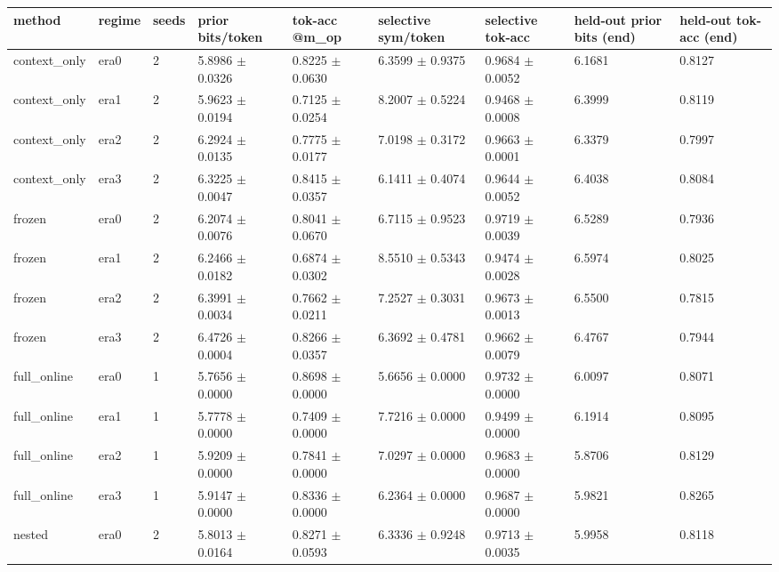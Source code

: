 \begin{tabular}{lllllllll}
\hline
method & regime & seeds & prior bits/token & tok-acc @m\_op & selective sym/token & selective tok-acc & held-out prior bits (end) & held-out tok-acc (end) \\
\hline
context\_only & era0 & 2 & 5.8986 $\pm$ 0.0326 & 0.8225 $\pm$ 0.0630 & 6.3599 $\pm$ 0.9375 & 0.9684 $\pm$ 0.0052 & 6.1681 & 0.8127 \\
context\_only & era1 & 2 & 5.9623 $\pm$ 0.0194 & 0.7125 $\pm$ 0.0254 & 8.2007 $\pm$ 0.5224 & 0.9468 $\pm$ 0.0008 & 6.3999 & 0.8119 \\
context\_only & era2 & 2 & 6.2924 $\pm$ 0.0135 & 0.7775 $\pm$ 0.0177 & 7.0198 $\pm$ 0.3172 & 0.9663 $\pm$ 0.0001 & 6.3379 & 0.7997 \\
context\_only & era3 & 2 & 6.3225 $\pm$ 0.0047 & 0.8415 $\pm$ 0.0357 & 6.1411 $\pm$ 0.4074 & 0.9644 $\pm$ 0.0052 & 6.4038 & 0.8084 \\
frozen & era0 & 2 & 6.2074 $\pm$ 0.0076 & 0.8041 $\pm$ 0.0670 & 6.7115 $\pm$ 0.9523 & 0.9719 $\pm$ 0.0039 & 6.5289 & 0.7936 \\
frozen & era1 & 2 & 6.2466 $\pm$ 0.0182 & 0.6874 $\pm$ 0.0302 & 8.5510 $\pm$ 0.5343 & 0.9474 $\pm$ 0.0028 & 6.5974 & 0.8025 \\
frozen & era2 & 2 & 6.3991 $\pm$ 0.0034 & 0.7662 $\pm$ 0.0211 & 7.2527 $\pm$ 0.3031 & 0.9673 $\pm$ 0.0013 & 6.5500 & 0.7815 \\
frozen & era3 & 2 & 6.4726 $\pm$ 0.0004 & 0.8266 $\pm$ 0.0357 & 6.3692 $\pm$ 0.4781 & 0.9662 $\pm$ 0.0079 & 6.4767 & 0.7944 \\
full\_online & era0 & 1 & 5.7656 $\pm$ 0.0000 & 0.8698 $\pm$ 0.0000 & 5.6656 $\pm$ 0.0000 & 0.9732 $\pm$ 0.0000 & 6.0097 & 0.8071 \\
full\_online & era1 & 1 & 5.7778 $\pm$ 0.0000 & 0.7409 $\pm$ 0.0000 & 7.7216 $\pm$ 0.0000 & 0.9499 $\pm$ 0.0000 & 6.1914 & 0.8095 \\
full\_online & era2 & 1 & 5.9209 $\pm$ 0.0000 & 0.7841 $\pm$ 0.0000 & 7.0297 $\pm$ 0.0000 & 0.9683 $\pm$ 0.0000 & 5.8706 & 0.8129 \\
full\_online & era3 & 1 & 5.9147 $\pm$ 0.0000 & 0.8336 $\pm$ 0.0000 & 6.2364 $\pm$ 0.0000 & 0.9687 $\pm$ 0.0000 & 5.9821 & 0.8265 \\
nested & era0 & 2 & 5.8013 $\pm$ 0.0164 & 0.8271 $\pm$ 0.0593 & 6.3336 $\pm$ 0.9248 & 0.9713 $\pm$ 0.0035 & 5.9958 & 0.8118 \\

\end{tabular}
